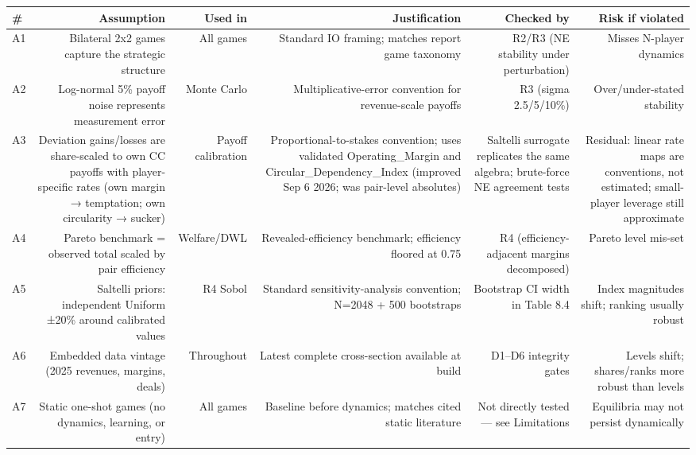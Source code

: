 

\begin{tabular}{@{}lrrrrr@{}}
\toprule
\# & Assumption & Used in & Justification & Checked by & Risk if violated \\
\midrule
A1 & Bilateral 2x2 games capture the strategic structure & All games & Standard IO framing; matches report game taxonomy & R2/R3 (NE stability under perturbation) & Misses N-player dynamics \\
A2 & Log-normal 5\% payoff noise represents measurement error & Monte Carlo & Multiplicative-error convention for revenue-scale payoffs & R3 (sigma 2.5/5/10\%) & Over/under-stated stability \\
A3 & Deviation gains/losses are share-scaled to own CC payoffs with player-specific rates (own margin → temptation; own circularity → sucker) & Payoff calibration & Proportional-to-stakes convention; uses validated Operating\_Margin and Circular\_Dependency\_Index (improved Sep 6 2026; was pair-level absolutes) & Saltelli surrogate replicates the same algebra; brute-force NE agreement tests & Residual: linear rate maps are conventions, not estimated; small-player leverage still approximate \\
A4 & Pareto benchmark = observed total scaled by pair efficiency & Welfare/DWL & Revealed-efficiency benchmark; efficiency floored at 0.75 & R4 (efficiency-adjacent margins decomposed) & Pareto level mis-set \\
A5 & Saltelli priors: independent Uniform ±20\% around calibrated values & R4 Sobol & Standard sensitivity-analysis convention; N=2048 + 500 bootstraps & Bootstrap CI width in Table 8.4 & Index magnitudes shift; ranking usually robust \\
A6 & Embedded data vintage (2025 revenues, margins, deals) & Throughout & Latest complete cross-section available at build & D1–D6 integrity gates & Levels shift; shares/ranks more robust than levels \\
A7 & Static one-shot games (no dynamics, learning, or entry) & All games & Baseline before dynamics; matches cited static literature & Not directly tested — see Limitations & Equilibria may not persist dynamically \\

\end{tabular}
